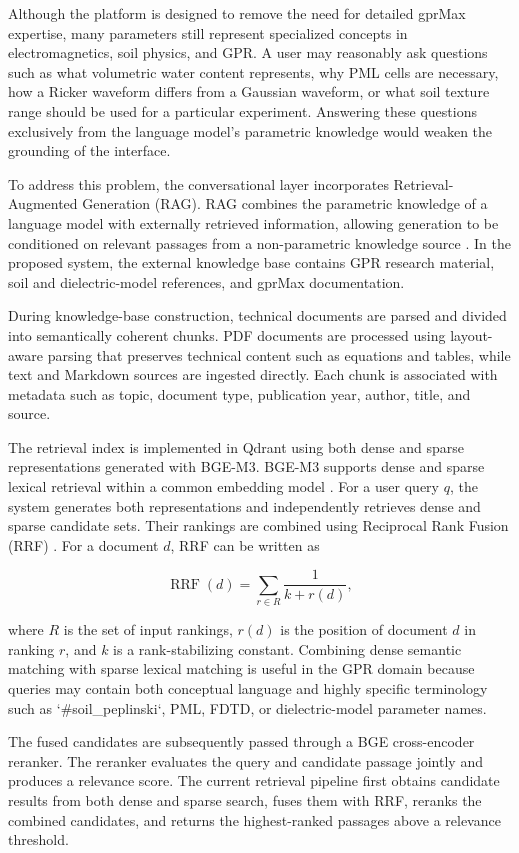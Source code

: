 \documentclass[journal]{IEEEtran}
\begin{document}
Although the platform is designed to remove the need for detailed gprMax expertise, many parameters still represent specialized concepts in electromagnetics, soil physics, and GPR. A user may reasonably ask questions such as what volumetric water content represents, why PML cells are necessary, how a Ricker waveform differs from a Gaussian waveform, or what soil texture range should be used for a particular experiment. Answering these questions exclusively from the language model's parametric knowledge would weaken the grounding of the interface.

To address this problem, the conversational layer incorporates Retrieval-Augmented Generation (RAG). RAG combines the parametric knowledge of a language model with externally retrieved information, allowing generation to be conditioned on relevant passages from a non-parametric knowledge source \cite{lewis2020rag}. In the proposed system, the external knowledge base contains GPR research material, soil and dielectric-model references, and gprMax documentation.

During knowledge-base construction, technical documents are parsed and divided into semantically coherent chunks. PDF documents are processed using layout-aware parsing that preserves technical content such as equations and tables, while text and Markdown sources are ingested directly. Each chunk is associated with metadata such as topic, document type, publication year, author, title, and source.

The retrieval index is implemented in Qdrant using both dense and sparse representations generated with BGE-M3. BGE-M3 supports dense and sparse lexical retrieval within a common embedding model \cite{chen2024bgem3}. For a user query \(q\), the system generates both representations and independently retrieves dense and sparse candidate sets. Their rankings are combined using Reciprocal Rank Fusion (RRF) \cite{cormack2009rrf}. For a document \(d\), RRF can be written as

$$
\operatorname{RRF}(d)
=
\sum_{r\in R}
\frac{1}{k+r(d)},
$$

where \(R\) is the set of input rankings, \(r(d)\) is the position of document \(d\) in ranking \(r\), and \(k\) is a rank-stabilizing constant. Combining dense semantic matching with sparse lexical matching is useful in the GPR domain because queries may contain both conceptual language and highly specific terminology such as `\#soil\_peplinski`, PML, FDTD, or dielectric-model parameter names.

The fused candidates are subsequently passed through a BGE cross-encoder reranker. The reranker evaluates the query and candidate passage jointly and produces a relevance score. The current retrieval pipeline first obtains candidate results from both dense and sparse search, fuses them with RRF, reranks the combined candidates, and returns the highest-ranked passages above a relevance threshold.
\end{document}
